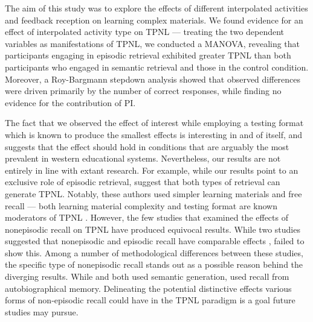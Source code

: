 \documentclass[../main.tex]{subfiles}
\begin{document}
The aim of this study was to explore the effects of different interpolated  
activities and feedback reception on learning complex materials. We found 
evidence for an effect of interpolated activity type on TPNL — treating the 
two dependent variables as manifestations of TPNL, we conducted a MANOVA, 
revealing that participants engaging in episodic retrieval exhibited greater 
TPNL than both participants who engaged in semantic retrieval and those in 
the control condition. Moreover, a Roy-Bargmann stepdown analysis showed 
that observed differences were driven primarily by the number of correct 
responses, while finding no evidence for the contribution of PI.

The fact that we observed the effect of interest while employing a testing 
format which is known to produce the smallest effects is interesting in and 
of itself, and suggests that the effect should hold in conditions that are 
arguably the most prevalent in western educational systems. Nevertheless, 
our results are not entirely in line with extant research. For example, 
while our results point to an exclusive role of episodic retrieval, 
\cite{pastotterRetrievalLearningFacilitates2011} suggest 
that both types of retrieval can generate TPNL. Notably, these authors used 
simpler learning materials and free recall — both learning material 
complexity and testing format are known moderators of TPNL 
\citep{chanRetrievalPotentiatesNew2018}. However, the few studies that 
examined the effects of nonepisodic recall on TPNL have produced equivocal 
results. While two studies suggested that nonepisodic and episodic recall 
have comparable effects \citep{divisRetrievalSpeedsContext2014, 
pastotterRetrievalLearningFacilitates2011}, 
\cite{weinsteinNotAllRetrieval2015} failed to show this. Among a number of 
methodological differences between these studies, the specific type of 
nonepisodic recall stands out as a possible reason behind the diverging 
results. While \cite{pastotterRetrievalLearningFacilitates2011} and 
\cite{divisRetrievalSpeedsContext2014} both used semantic generation, 
\cite{weinsteinNotAllRetrieval2015} used recall from autobiographical 
memory. Delineating the potential distinctive effects various forms of 
non-episodic recall could have in the TPNL paradigm is a goal future studies 
may pursue.
\end{document}
